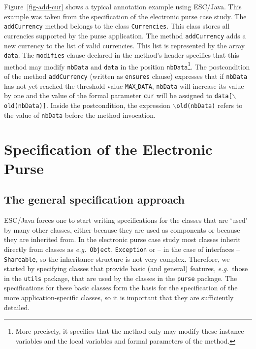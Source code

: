 \documentclass[a4paper]{llncs}
\begin{document}
Figure~\ref{fig-add-cur} shows a typical annotation example using
ESC/Java. This example was taken from the specification of the
electronic purse case study. The \texttt{addCurrency} method belongs
to the class \texttt{Currencies}. This class stores all currencies
supported by the purse application. The method
\texttt{addCurrency} adds a new currency to the list of valid
currencies. This list is represented by the
array \texttt{data}. The \texttt{modifies} clause declared in the
method's header specifies that
this method may modify \texttt{nbData} and
\texttt{data} in the position \texttt{nbData}\footnote{More precisely, it
specifies that the method only may modify these instance variables and
the local variables and formal parameters of the method.}. The
postcondition of the method \texttt{addCurrency} (written as
\texttt{ensures} clause) expresses that if \texttt{nbData} has not
yet reached the threshold value \texttt{MAX$\_$DATA}, \texttt{nbData}
will increase its value by one and the value of the formal parameter
\texttt{cur} will be assigned to \texttt{data[\(\backslash\)old(nbData)]}. 
Inside the postcondition, the expression
\texttt{$\backslash$old(nbData)} refers to the value of
\texttt{nbData} before the method invocation.






\section{Specification of the Electronic Purse}
\label{SectSpecPurse}


\subsection{The general specification approach}
ESC/Java forces one to start writing specifications for the classes
that are `used' by many other classes, either because they are used as 
components or because they are inherited from. In the electronic purse 
case study most classes inherit directly from classes as
\emph{e.g.}~\texttt{Object}, \texttt{Exception} or -- in the case of
interfaces -- \texttt{Shareable}, so the inheritance structure is not
very complex. Therefore, we started by specifying classes that
provide basic (and general) features, \emph{e.g.}~those in the
\texttt{utils} package,
that are used by the classes in the \texttt{purse} package. The
specifications for these basic classes form the basis for the
specification of the more application-specific classes, so it is
important that they are sufficiently detailed.
\end{document}
